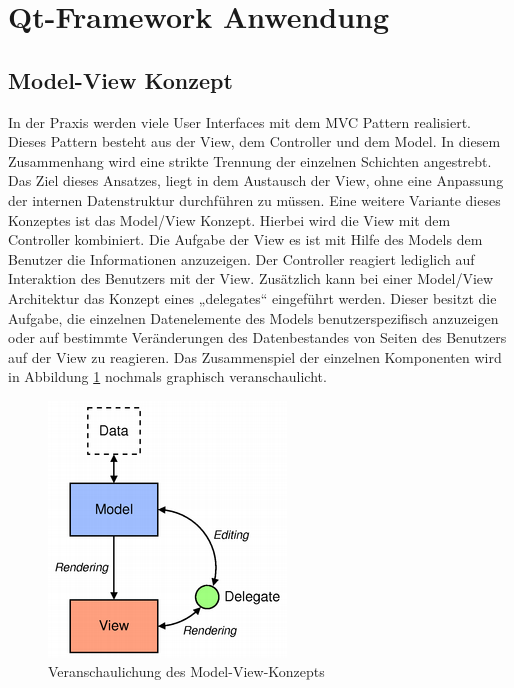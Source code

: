 \newpage
\section{Qt-Framework Anwendung}

\subsection{Model-View Konzept}

In der Praxis werden viele User Interfaces mit dem MVC Pattern realisiert. Dieses Pattern besteht aus der View, dem Controller und dem Model. In diesem Zusammenhang wird eine strikte Trennung der einzelnen Schichten angestrebt. Das Ziel dieses Ansatzes, liegt in dem Austausch der View, ohne eine Anpassung der internen Datenstruktur durchführen zu müssen. Eine weitere Variante dieses Konzeptes ist das Model/View Konzept. Hierbei wird die View mit dem Controller kombiniert. Die Aufgabe der View es ist mit Hilfe des Models dem Benutzer die Informationen anzuzeigen. Der Controller reagiert lediglich auf Interaktion des Benutzers mit der View. Zusätzlich kann bei einer Model/View Architektur das Konzept eines „delegates“ eingeführt werden. Dieser besitzt die Aufgabe, die einzelnen Datenelemente des Models benutzerspezifisch anzuzeigen oder auf bestimmte Veränderungen des Datenbestandes von Seiten des Benutzers auf der View zu reagieren. Das Zusammenspiel der einzelnen Komponenten wird in Abbildung \ref{pic:ModelView} nochmals graphisch veranschaulicht.

\begin{figure}[H]
	\centering
	\includegraphics[scale=1.0]{images/ModelView.png}
	\caption{Veranschaulichung des Model-View-Konzepts}
	\label{pic:ModelView}
\end{figure}

